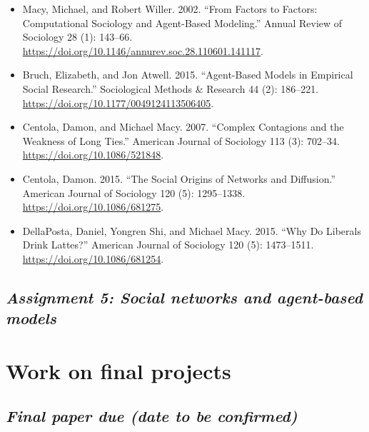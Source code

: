 \documentclass[
  10pt,
]{article}
\providecommand{\tightlist}{%
  \setlength{\itemsep}{0pt}\setlength{\parskip}{0pt}}
\begin{document}
\begin{itemize}
\tightlist
\item
  Macy, Michael, and Robert Willer. 2002. ``From Factors to Factors:
  Computational Sociology and Agent-Based Modeling.'' Annual Review of
  Sociology 28 (1): 143--66.
  \url{https://doi.org/10.1146/annurev.soc.28.110601.141117}.
\item
  Bruch, Elizabeth, and Jon Atwell. 2015. ``Agent-Based Models in
  Empirical Social Research.'' Sociological Methods \& Research 44 (2):
  186--221. \url{https://doi.org/10.1177/0049124113506405}.
\item
  Centola, Damon, and Michael Macy. 2007. ``Complex Contagions and the
  Weakness of Long Ties.'' American Journal of Sociology 113 (3):
  702--34. \url{https://doi.org/10.1086/521848}.
\item
  Centola, Damon. 2015. ``The Social Origins of Networks and
  Diffusion.'' American Journal of Sociology 120 (5): 1295--1338.
  \url{https://doi.org/10.1086/681275}.
\item
  DellaPosta, Daniel, Yongren Shi, and Michael Macy. 2015. ``Why Do
  Liberals Drink Lattes?'' American Journal of Sociology 120 (5):
  1473--1511. \url{https://doi.org/10.1086/681254}.
\end{itemize}

\hypertarget{assignment-5-social-networks-and-agent-based-models}{%
\subsection{\texorpdfstring{\emph{Assignment 5: Social networks and
agent-based
models}}{Assignment 5: Social networks and agent-based models}}\label{assignment-5-social-networks-and-agent-based-models}}

\hypertarget{work-on-final-projects}{%
\section{Work on final projects}\label{work-on-final-projects}}

\hypertarget{final-paper-due-date-to-be-confirmed}{%
\subsection{\texorpdfstring{\emph{Final paper due (date to be
confirmed)}}{Final paper due (date to be confirmed)}}\label{final-paper-due-date-to-be-confirmed}}
\end{document}
